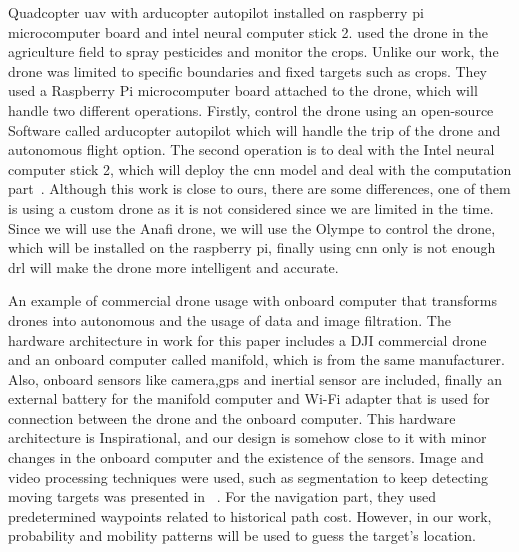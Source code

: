 \documentclass[../main.tex]{subfiles}
\begin{document}
Quadcopter \gls{uav} with arducopter autopilot installed on raspberry pi microcomputer board and intel neural computer stick 2.
\citeauthor{Khan21} used the drone in the agriculture field to spray pesticides and monitor the crops. Unlike our work, the drone was limited to specific
boundaries and fixed targets such as crops.
They used a Raspberry Pi microcomputer board attached to the drone, which will handle two different operations. Firstly, control the drone using an open-source Software called arducopter autopilot which will handle the trip of the drone and autonomous flight option. The second operation is to deal with the Intel neural computer stick 2, which will deploy the \gls{cnn} model and deal with the computation part~\cite{Khan21}.
Although this work is close to ours, there are some differences, 
one of them is using a custom drone as it is not considered since we are limited in the time.
Since we will use the Anafi drone, we will use the Olympe to control the drone, which will be installed on the raspberry pi, finally using \gls{cnn} only is not enough \gls{drl} will make the drone more intelligent and accurate.



An example of commercial drone usage with onboard computer that transforms drones into autonomous and the usage of data and image filtration.
The hardware architecture in \citeauthor{Wang18} work for this paper includes a DJI commercial drone and an onboard computer called manifold, which is from the same manufacturer. Also, onboard sensors like camera,\gls{gps} and inertial sensor are included, finally an external battery for the manifold computer and Wi-Fi adapter that is used for connection between the drone and the onboard computer. This hardware architecture is Inspirational, and our design is somehow close to it with minor changes in the onboard computer and the existence of the sensors.   
Image and video processing techniques were used, such as segmentation to keep detecting moving targets was presented in ~\cite{Wang18}.
For the navigation part, they used predetermined waypoints related to historical path cost. However, in our work, probability and mobility patterns will be used to guess the target's location.
\end{document}
